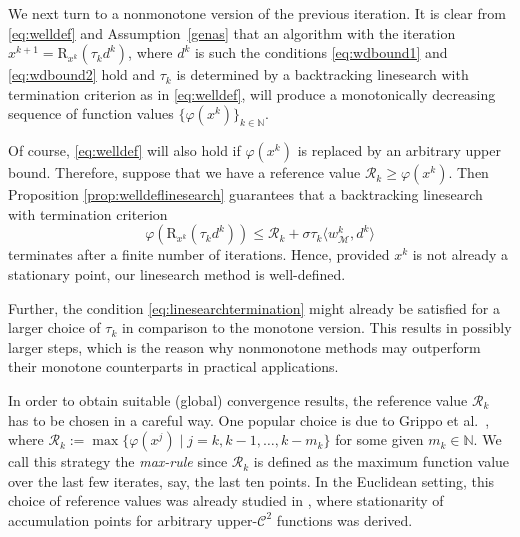 \documentclass[a4paper, 12pt]{article}
\numberwithin{equation}{section}
\theoremstyle{bolddef}
\theoremstyle{definition}
\theoremstyle{boldplain}
\newcommand{\xk}{x^k}
\newcommand{\wk}{w^k}
\newcommand{\dk}{d^k}
\newcommand{\tauk}{\tau_k}
\newcommand{\xkp}{x^{k+1}}
\newcommand{\xj}{x^j}
\newcommand{\N}{\mathbb{N}}
\newcommand{\Rvalue}{\mathcal{R}}
\newcommand{\retr}{\mathrm{R}}
\begin{document}
We next turn to a nonmonotone version of the previous iteration. 
It is clear from \eqref{eq:welldef} and Assumption~\ref{genas} that an algorithm with the iteration $\xkp = \retr_{\xk}(\tauk \dk)$, where $\dk$ is such the conditions \eqref{eq:wdbound1} and \eqref{eq:wdbound2} hold and $\tauk$ is determined by a backtracking linesearch with termination criterion as in \eqref{eq:welldef}, will produce a monotonically decreasing sequence of function values $\{\varphi(\xk)\}_{k \in \mathbb{N}}$.

Of course, \eqref{eq:welldef} will also hold if $\varphi(\xk)$ is replaced by an arbitrary upper bound. Therefore, suppose that we have a reference value $\Rvalue_k \geq \varphi(\xk)$. Then Proposition \ref{prop:welldeflinesearch} guarantees that a backtracking linesearch with termination criterion
\begin{equation}\label{eq:linesearchtermination}
	\varphi(\retr_{\xk}(\tauk \dk)) \leq \Rvalue_k + \sigma \tauk \langle \wk_\mathcal{M}, \dk \rangle
\end{equation}
terminates after a finite number of iterations. Hence, provided $\xk$ is not already a stationary point, our linesearch method is well-defined.

Further, the condition \eqref{eq:linesearchtermination} might already be satisfied for a larger choice
of $ \tau_k $ in comparison to the monotone version. This results in possibly larger steps, which is the
reason why nonmonotone methods may outperform their monotone
counterparts in practical applications. 

In order to obtain
suitable (global) convergence results, the reference value $ \Rvalue_k $
has to be chosen in a careful way. One popular choice is due to
Grippo et al.\ \cite{GrippoLamparielloLucidi1986}, 
where $ \Rvalue_k := \max \{ \varphi(\xj) \mid j = k, k-1, \ldots, k - m_k \} $ for some given $ m_k \in \N $. We call this
strategy the \emph{max-rule} since $ \Rvalue_k $ is defined as the maximum
function value over the last few iterates, say, the last ten points. In the Euclidean setting, this choice of reference values was already studied in \cite{aragon2025}, where stationarity of accumulation points for arbitrary upper-$\mathcal{C}^2$ functions was derived.
\end{document}
